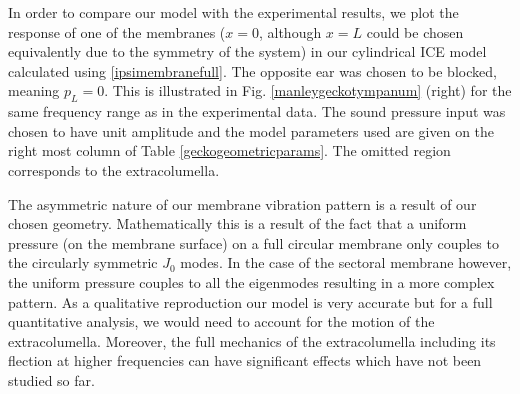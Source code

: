 In order to compare our model with the experimental results, we plot the response of one of the membranes ($x=0$, although $x=L$ could be
chosen equivalently due to the symmetry of the system) in our cylindrical ICE model 
calculated using \eqref{ipsimembranefull}. The opposite ear was chosen to be blocked, meaning $p_L=0$. 
This is illustrated in Fig. \ref{manleygeckotympanum} (right) for the same frequency range as in the experimental data. The sound pressure input was chosen to have unit amplitude and the model parameters used are given
on the right most column of Table \ref{geckogeometricparams}. The omitted region corresponds to the extracolumella. 

The asymmetric nature of our membrane vibration pattern is a result of our chosen geometry.
Mathematically this is a result of the fact that a uniform pressure (on the membrane surface) on a full circular membrane only couples to the circularly symmetric $J_0$ modes.
In the case of the sectoral membrane however, the uniform pressure couples to all the eigenmodes resulting in a more complex pattern.
As a qualitative reproduction our model is very accurate but for a full quantitative analysis, we would 
need to account for the motion of the extracolumella. Moreover, the full mechanics of the extracolumella including 
 its flection at higher frequencies can have significant effects which have not been studied so far.

